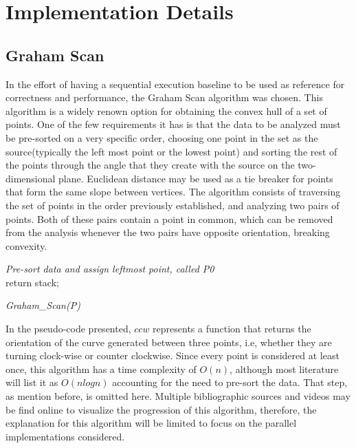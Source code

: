 \documentclass{article}
\begin{document}
\section{Implementation Details}

\subsection{Graham Scan}

In the effort of having a sequential execution baseline to be used as reference for correctness and performance, the Graham Scan\cite{Graham_72} algorithm was chosen. This algorithm is a widely renown option for obtaining the convex hull of a set of points. One of the few requirements it has is that the data to be analyzed must be pre-sorted on a very specific order, choosing one point in the set as the source(typically the left most point or the lowest point) and sorting the rest of the points through the angle that they create with the source on the two-dimensional plane. Euclidean distance may be used as a tie breaker for points that form the same slope between vertices. The algorithm consists of traversing the set of points in the order previously established, and analyzing two pairs of points. Both of these pairs contain a point in common, which can be removed from the analysis whenever the two pairs have opposite orientation, breaking convexity.

\begin{algorithm}[H]
\SetAlgoLined
{}

\textit{Pre-sort data and assign leftmost point, called P0}\\
return stack;
\caption{\textit{Graham_Scan(P)}}
\end{algorithm}

In the pseudo-code presented, $ccw$ represents a function that returns the orientation of the curve generated between three points, i.e, whether they are turning clock-wise or counter clockwise. Since every point is considered at least once, this algorithm has a time complexity of $O(n)$, although most literature will list it as $O(nlogn)$ accounting for the need to pre-sort the data. That step, as mention before, is omitted here. Multiple bibliographic sources and videos may be find online to visualize the progression of this algorithm, therefore, the explanation for this algorithm will be limited to focus on the parallel implementations considered.
\end{document}
